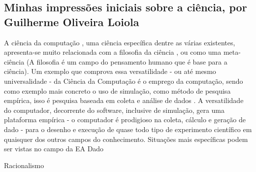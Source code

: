 \subsection{Minhas impressões iniciais sobre a ciência, por Guilherme Oliveira Loiola}

A ciência da computação \citep{baldwin_three-fold_1994}, uma ciência específica dentre as várias existentes, apresenta-se muito relacionada com a filosofia da ciência \citep{floridi_blackwell_2004}, ou como uma meta-ciência (A filosofia é um campo do pensamento humano que é base para a ciência). Um exemplo que comprova essa versatilidade - ou até mesmo universalidade - da Ciência da Computação é o emprego da computação, sendo como exemplo mais concreto o uso de simulação, como método de pesquisa empírica, isso é pesquisa baseada em coleta e análise de dados \citep{tedre_experiments_2014}. A versatilidade do computador, decorrente do software, inclusive de simulação, gera uma plataforma empírica - o computador é prodigioso na coleta, cálculo e geração de dado - para o desenho e execução de quase todo tipo de experimento científico em quaisquer dos outros campos do conhecimento. Situações mais específicas podem ser vistas no campo da \gls{EA} \gls{Dado}

\citet{noauthor_reprodutibilidade_2021}
\gls{Racionalismo}

\gls{}
